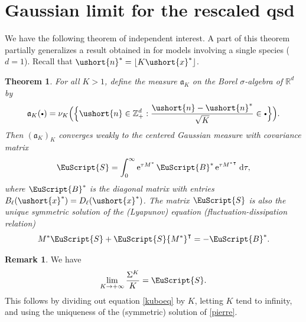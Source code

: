 \documentclass[JEP,XML,SOM,Unicode]{cedram}
\newcommand{\sbullet}{{\scriptscriptstyle\bullet}}
\newcommand{\csbullet}{{\raisebox{1pt}{$\sbullet$}}}
\numberwithin{equation}{section}
\theoremstyle{plain}
\newtheorem{theorem}{Theorem}[section]
\theoremstyle{definition}
\newtheorem{remark}{Remark}[section]
\newcommand{\real}{\mathbb{R}}
\newcommand{\zentiers}{{\mathbb{Z}}}
\newcommand{\domaine}{\zentiers_{+}^{d}}
\newcommand{\sK}{K}
\newcommand{\vecn}{\ushort{n}}
\newcommand{\vecnf}{\ushort{n}^*}
\newcommand{\vecxf}{\ushort{x}^*}
\newcommand{\nuk}{\nu_{K}}\let\snuk\nuk
\newcommand{\e}{\operatorname{e}}
\newcommand{\dd}{\hspace{1pt}\mathrm{d}}
\begin{document}
\section{Gaussian limit for the rescaled qsd}

We have the following theorem of independent interest. A part of this theorem partially generalizes a result obtained
in \cite{ccm1} for models involving a single species ($d=1$). Recall that $\vecnf = \lfloor K\vecxf \rfloor$.
\begin{theorem}
\label{confinement}
For all $K>1$, define the measure $\mathfrak{a}_K$ on the Borel $\sigma$-algebra of $\real^d$ by
\[
\mathfrak{a}_{\sK}(\csbullet)=\nuk\Bigl(\Bigl\{ \vecn\in \domaine : \frac{\vecn-\vecnf}{\sqrt{K}}\in \csbullet\Bigr\}\Bigr).
\]
Then $(\mathfrak{a}_{\sK})_{\sK}$ converges weakly to the centered Gaussian measure with covariance matrix
\[
\EuScript{S}=\int_{0}^{\infty}\e^{\tau M^*}\EuScript{B}^*\e^{\tau {M^*}^{\intercal}}\dd\tau,
\]
where $\EuScript{B}^*$ is the diagonal matrix with entries $B_{\ell}(\vecxf)=D_{\ell}(\vecxf)$.
The matrix $\EuScript{S}$ is also the unique symmetric solution of the (Lyapunov)
equation (fluctuation-dissipation relation)
\begin{equation}\label{pierre}
M^* \EuScript{S}+\EuScript{S} {M^*}^{\intercal}=-\EuScript{B}^*.
\end{equation}
\end{theorem}

\begin{remark}
We have
\[
\lim_{\sK\to+\infty} \frac{\Sigma^{\sK}}{K}=\EuScript{S}.
\]
This follows by dividing out equation \eqref{kuboeq} by $K$, letting $K$ tend to infinity, and using the uniqueness
of the (symmetric) solution of \eqref{pierre}.
\end{remark}
\end{document}
